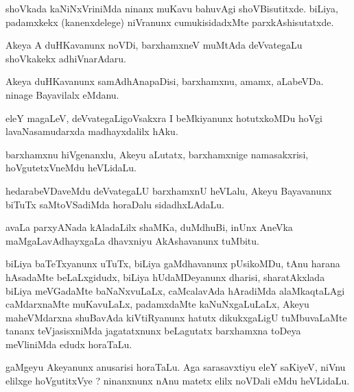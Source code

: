 \documentclass{article}
\begin{document}
\begin{mn}
shoVkada  kaNiNxVriniMda  ninanx muKavu  bahuvAgi  shoVBisutitxde.  biLiya, 
padamxkekx (kanenxdelege) niVranunx  cumukisidadxMte  parxkAshisutatxde.
\end{mn}

\begin{mn}
Akeya  A  duHKavanunx  noVDi,  barxhamxneV  muMtAda  deVvategaLu  shoVkakekx  adhiVnarAdaru.
\end{mn}

\begin{mn}
Akeya duHKavanunx  samAdhAnapaDisi,  barxhamxnu,  amamx,  aLabeVDa.  
ninage  Bayavilalx  eMdanu.
\end{mn}

\begin{mn}
eleY  magaLeV,  deVvategaLigoVsakxra  I  beMkiyanunx  hotutxkoMDu  hoVgi  
lavaNasamudarxda  madhayxdalilx  hAku.
\end{mn}

\begin{mn}
barxhamxnu  hiVgenanxlu,  Akeyu  aLutatx,  barxhamxnige  namasakxrisi,  
hoVgutetxVneMdu  heVLidaLu.
\end{mn}

\begin{mn}
hedarabeVDaveMdu  deVvategaLU barxhamxnU  heVLalu,  Akeyu  Bayavanunx  
biTuTx  saMtoVSadiMda  horaDalu  sidadhxLAdaLu. 
\end{mn}

\begin{mn}
avaLa  parxyANada  kAladaLilx  shaMKa,  duMdhuBi,  inUnx AneVka  maMgaLavAdhayxgaLa  
dhavxniyu  AkAshavanunx  tuMbitu.
\end{mn}

\begin{mn}
biLiya  baTeTxyanunx  uTuTx,  biLiya  gaMdhavanunx  pUsikoMDu,  tAnu  harana  
hAsadaMte  beLaLxgidudx,  biLiya  hUdaMDeyanunx  dharisi,  sharatAkxlada  biLiya  
meVGadaMte  baNaNxvuLaLx, caMcalavAda  hAradiMda  alaMkaqtaLAgi  caMdarxnaMte  
muKavuLaLx,  padamxdaMte  kaNuNxgaLuLaLx,  Akeyu  maheVMdarxna  shuBavAda  
kiVtiRyanunx  hatutx  dikukxgaLigU  tuMbuvaLaMte  tananx  teVjasisxniMda  
jagatatxnunx  beLagutatx  barxhamxna  toDeya meVliniMda  edudx  horaTaLu.
\end{mn}

\begin{mn}
gaMgeyu  Akeyanunx  anusarisi  horaTaLu.  Aga  sarasavxtiyu  eleY  saKiyeV,  
niVnu  elilxge  hoVgutitxVye ?  ninanxnunx  nAnu  matetx  elilx noVDali  eMdu  heVLidaLu.
\end{mn}
\end{document}
